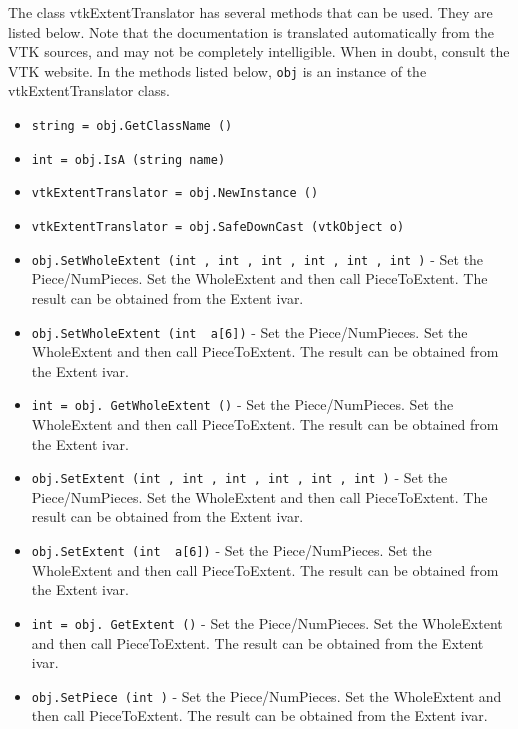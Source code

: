 The class vtkExtentTranslator has several methods that can be used.
  They are listed below.
Note that the documentation is translated automatically from the VTK sources,
and may not be completely intelligible.  When in doubt, consult the VTK website.
In the methods listed below, \verb|obj| is an instance of the vtkExtentTranslator class.
\begin{itemize}
\item  \verb|string = obj.GetClassName ()|

\item  \verb|int = obj.IsA (string name)|

\item  \verb|vtkExtentTranslator = obj.NewInstance ()|

\item  \verb|vtkExtentTranslator = obj.SafeDownCast (vtkObject o)|

\item  \verb|obj.SetWholeExtent (int , int , int , int , int , int )| -  Set the Piece/NumPieces. Set the WholeExtent and then call PieceToExtent.
 The result can be obtained from the Extent ivar.

\item  \verb|obj.SetWholeExtent (int  a[6])| -  Set the Piece/NumPieces. Set the WholeExtent and then call PieceToExtent.
 The result can be obtained from the Extent ivar.

\item  \verb|int = obj. GetWholeExtent ()| -  Set the Piece/NumPieces. Set the WholeExtent and then call PieceToExtent.
 The result can be obtained from the Extent ivar.

\item  \verb|obj.SetExtent (int , int , int , int , int , int )| -  Set the Piece/NumPieces. Set the WholeExtent and then call PieceToExtent.
 The result can be obtained from the Extent ivar.

\item  \verb|obj.SetExtent (int  a[6])| -  Set the Piece/NumPieces. Set the WholeExtent and then call PieceToExtent.
 The result can be obtained from the Extent ivar.

\item  \verb|int = obj. GetExtent ()| -  Set the Piece/NumPieces. Set the WholeExtent and then call PieceToExtent.
 The result can be obtained from the Extent ivar.

\item  \verb|obj.SetPiece (int )| -  Set the Piece/NumPieces. Set the WholeExtent and then call PieceToExtent.
 The result can be obtained from the Extent ivar.


\end{itemize}
